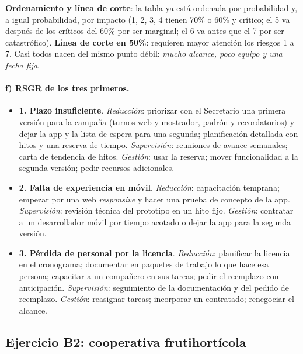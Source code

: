 \documentclass[11pt,a4paper]{article}
\begin{document}
\textbf{Ordenamiento y línea de corte}: la tabla ya está ordenada por probabilidad y, a igual probabilidad, por
impacto (1, 2, 3, 4 tienen 70\% o 60\% y crítico; el 5 va después de los críticos del 60\% por ser marginal; el 6
va antes que el 7 por ser catastrófico). \textbf{Línea de corte en 50\%}: requieren mayor atención los riesgos 1 a
7. Casi todos nacen del mismo punto débil: \emph{mucho alcance, poco equipo y una fecha fija}.

\paragraph{f) RSGR de los tres primeros.}
\begin{itemize}
  \item \textbf{1. Plazo insuficiente}. \emph{Reducción}: priorizar con el Secretario una primera versión para
  la campaña (turnos web y mostrador, padrón y recordatorios) y dejar la app y la lista de espera para una
  segunda; planificación detallada con hitos y una reserva de tiempo. \emph{Supervisión}: reuniones de avance
  semanales; carta de tendencia de hitos. \emph{Gestión}: usar la reserva; mover funcionalidad a la segunda
  versión; pedir recursos adicionales.
  \item \textbf{2. Falta de experiencia en móvil}. \emph{Reducción}: capacitación temprana; empezar por una web
  \emph{responsive} y hacer una prueba de concepto de la app. \emph{Supervisión}: revisión técnica del prototipo en
  un hito fijo. \emph{Gestión}: contratar a un desarrollador móvil por tiempo acotado o dejar la app para la
  segunda versión.
  \item \textbf{3. Pérdida de personal por la licencia}. \emph{Reducción}: planificar la licencia en el
  cronograma; documentar en paquetes de trabajo lo que hace esa persona; capacitar a un compañero en sus tareas;
  pedir el reemplazo con anticipación. \emph{Supervisión}: seguimiento de la documentación y del pedido de
  reemplazo. \emph{Gestión}: reasignar tareas; incorporar un contratado; renegociar el alcance.
\end{itemize}

\subsection*{Ejercicio B2: cooperativa frutihortícola}
\end{document}
